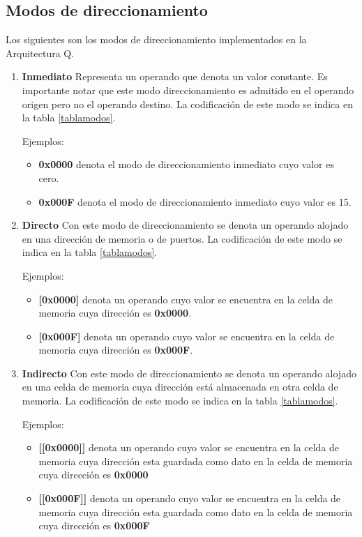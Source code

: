 \subsection{Modos de direccionamiento}
Los siguientes son los modos de direccionamiento implementados en la Arquitectura Q.
\begin{enumerate}

\item \textbf{Inmediato} Representa un operando que denota un valor constante. Es importante notar que este modo direccionamiento es admitido en el operando origen pero no el operando destino. La codificación de este modo se indica en la tabla \ref{tablamodos}.

Ejemplos:
\begin{itemize}
\item \textbf{0x0000} denota el modo de direccionamiento inmediato cuyo valor es cero.
\item \textbf{0x000F} denota el modo de direccionamiento inmediato cuyo valor es 15.
\end{itemize}


\item \textbf{Directo}
Con este modo de direccionamiento se denota un operando alojado en una dirección de memoria o de puertos. La codificación de este modo se indica en la tabla \ref{tablamodos}.

Ejemplos:
\begin{itemize}
\item \textbf{[0x0000]} denota un operando cuyo valor se encuentra en la celda de memoria cuya dirección es \textbf{0x0000}.
\item \textbf{[0x000F]} denota  un operando cuyo valor se encuentra en la celda de memoria cuya dirección es \textbf{0x000F}.
\end{itemize}


\item \textbf{Indirecto}
Con este modo de direccionamiento se denota un operando alojado en una celda de memoria cuya dirección está almacenada en otra celda de memoria. La codificación de este modo se indica en la tabla \ref{tablamodos}.

Ejemplos:
\begin{itemize}
\item \textbf{[[0x0000]]} denota un operando cuyo valor se encuentra en la celda de memoria cuya dirección esta guardada como dato en la celda de memoria cuya dirección es \textbf{0x0000}
\item \textbf{[[0x000F]]} denota un operando cuyo valor se encuentra en la celda de memoria cuya dirección esta guardada como dato en la celda de memoria cuya dirección es \textbf{0x000F}
\end{itemize}


\end{enumerate}
